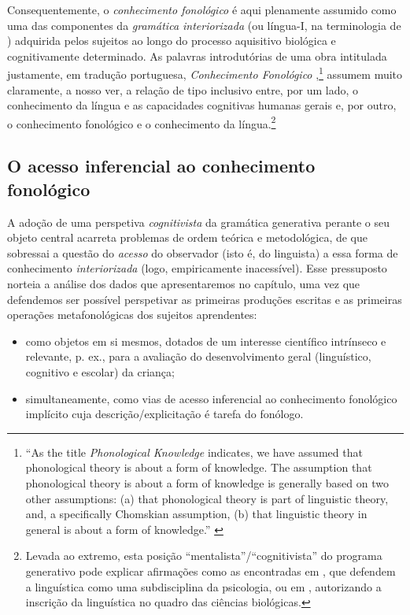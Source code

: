 \documentclass[output=paper]{LSP/langsci}
\begin{document}
Consequentemente, o \textit{conhecimento fonológico} é aqui plenamente assumido como uma das componentes da \textit{gramática interiorizada} (ou língua-I, na terminologia de \citealt{chomsky1986}) adquirida pelos sujeitos ao longo do processo aquisitivo biológica e cognitivamente determinado. As palavras introdutórias de uma obra intitulada justamente, em tradução portuguesa, \textit{Conhecimento Fonológico} \citep{burtonroberts_etal2000},\footnote {``As the title \textit{Phonological Knowledge} indicates, we have assumed that phonological theory is about a form of knowledge. The assumption that phonological theory is about a form of knowledge is generally based on two other assumptions: (a) that phonological theory is part of linguistic theory, and, a specifically Chomskian assumption, (b) that linguistic theory in general is about a form of knowledge.'' \citep[2]{burtonroberts_etal2000}} assumem muito claramente, a nosso ver, a relação de tipo inclusivo entre, por um lado, o conhecimento da língua e as capacidades cognitivas humanas gerais e, por outro, o conhecimento fonológico e o conhecimento da língua.\footnote{Levada ao extremo, esta posição ``mentalista''/``cognitivista'' do programa generativo pode explicar afirmações como as encontradas em \citet[46]{chomsky1986}, que defendem a linguística como uma subdisciplina da psicologia, ou em \citet[46]{chomsky1986}, autorizando a inscrição da linguística no quadro das ciências biológicas.}

\subsection{O acesso inferencial ao conhecimento fonológico}
\label{subsec:miranda_acesso}

A adoção de uma perspetiva \textit{cognitivista} da gramática generativa perante o seu objeto central acarreta problemas de ordem teórica e metodológica, de que sobressai a questão do \textit{acesso} do observador (isto é, do linguista) a essa forma de conhecimento \textit{interiorizada} (logo, empiricamente inacessível). Esse pressuposto norteia a análise dos dados que apresentaremos no capítulo, uma vez que defendemos ser possível perspetivar as primeiras produções escritas e as primeiras operações metafonológicas dos sujeitos aprendentes:

\begin{itemize}
\item como objetos em si mesmos, dotados de um interesse científico intrínseco e relevante, p. ex., para a avaliação do desenvolvimento geral (linguístico, cognitivo e escolar) da criança;
\item simultaneamente, como vias de acesso inferencial \citep{veloso2010} ao conhecimento fonológico implícito cuja descrição/explicitação é tarefa do fonólogo.
\end{itemize}
\end{document}
